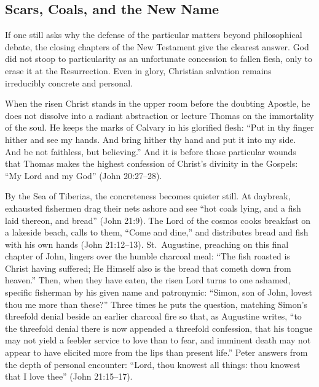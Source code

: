 \subsection{Scars, Coals, and the New Name}

If one still asks why the defense of the particular matters beyond philosophical debate, the closing chapters of the New Testament give the clearest answer. God did not stoop to particularity as an unfortunate concession to fallen flesh, only to erase it at the Resurrection. Even in glory, Christian salvation remains irreducibly concrete and personal.

When the risen Christ stands in the upper room before the doubting Apostle, he does not dissolve into a radiant abstraction or lecture Thomas on the immortality of the soul. He keeps the marks of Calvary in his glorified flesh: ``Put in thy finger hither and see my hands. And bring hither thy hand and put it into my side. And be not faithless, but believing.'' And it is before those particular wounds that Thomas makes the highest confession of Christ's divinity in the Gospels: ``My Lord and my God'' (John 20:27--28).

By the Sea of Tiberias, the concreteness becomes quieter still. At daybreak, exhausted fishermen drag their nets ashore and see ``hot coals lying, and a fish laid thereon, and bread'' (John 21:9). The Lord of the cosmos cooks breakfast on a lakeside beach, calls to them, ``Come and dine,'' and distributes bread and fish with his own hands (John 21:12--13). St.\ Augustine, preaching on this final chapter of John, lingers over the humble charcoal meal: ``The fish roasted is Christ having suffered; He Himself also is the bread that cometh down from heaven.'' Then, when they have eaten, the risen Lord turns to one ashamed, specific fisherman by his given name and patronymic: ``Simon, son of John, lovest thou me more than these?'' Three times he puts the question, matching Simon's threefold denial beside an earlier charcoal fire so that, as Augustine writes, ``to the threefold denial there is now appended a threefold confession, that his tongue may not yield a feebler service to love than to fear, and imminent death may not appear to have elicited more from the lips than present life.'' Peter answers from the depth of personal encounter: ``Lord, thou knowest all things: thou knowest that I love thee'' (John 21:15--17).


